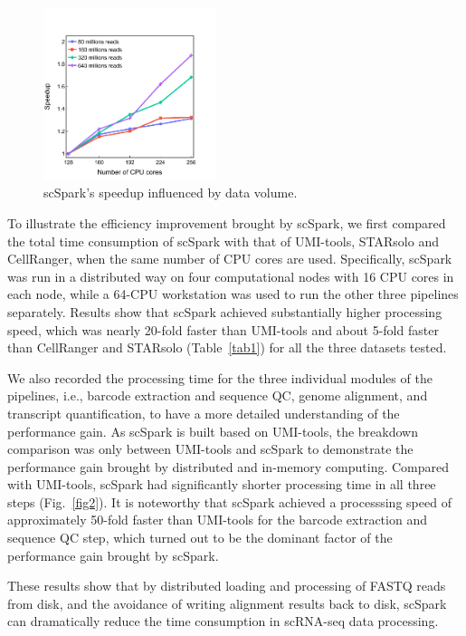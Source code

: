 \documentclass[conference]{IEEEtran}
\begin{document}
\begin{figure}
	\centering
	\includegraphics[width=0.45\textwidth]{fig5.pdf}
	\caption{scSpark's speedup influenced by data volume.} \label{fig5}
\end{figure}

To illustrate the efficiency improvement brought by scSpark, we first compared the total time consumption of scSpark with that of UMI-tools, STARsolo and CellRanger, when the same number of CPU cores are used. Specifically, scSpark was run in a distributed way on four computational nodes with 16 CPU cores in each node, while a 64-CPU workstation was used to run the other three pipelines separately. 
Results show that scSpark achieved substantially higher processing speed, which was nearly 20-fold faster than UMI-tools and about 5-fold faster than CellRanger and STARsolo (Table~\ref{tab1}) for all the three datasets tested.  

We also recorded the processing time for the three individual modules of the pipelines, i.e., barcode extraction and sequence QC, genome alignment, and transcript quantification, to have a more detailed understanding of the performance gain. 
As scSpark is built based on UMI-tools, the breakdown comparison was only between UMI-tools and scSpark to demonstrate the performance gain brought by distributed and in-memory computing. 
Compared with UMI-tools, scSpark had significantly shorter processing time in all three steps (Fig.~\ref{fig2}).
It is noteworthy that scSpark achieved a processsing speed of approximately 50-fold faster than UMI-tools for the barcode extraction and sequence QC step, which turned out to be the dominant factor of the performance gain brought by scSpark. 

These results show that by distributed loading and processing of FASTQ reads from disk, and the avoidance of writing alignment results back to disk, scSpark can dramatically reduce the time consumption in scRNA-seq data processing. 
\end{document}
